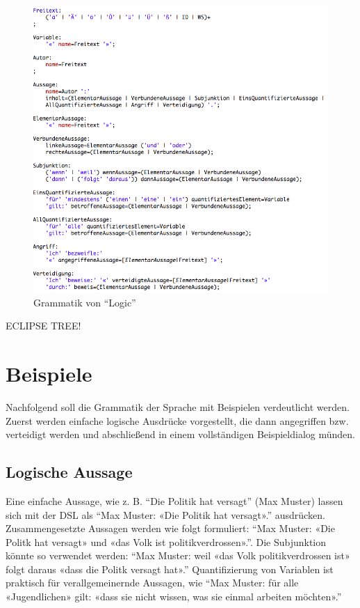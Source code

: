 \documentclass[11pt,a4paper,bibtotocnumbered]{scrreprt}
\begin{document}
\begin{figure}[htbp]
\centering
\includegraphics[width=1\textwidth]{img/grammatik.png}
\caption{Grammatik von \enquote{Logic}}
\label{grammatik}
\end{figure}


ECLIPSE TREE!

\section{Beispiele}

Nachfolgend soll die Grammatik der Sprache mit Beispielen verdeutlicht werden.
Zuerst werden einfache logische Ausdrücke vorgestellt, die dann angegriffen bzw. verteidigt werden und abschließend in einem vollständigen Beispieldialog münden.

\subsection{Logische Aussage}

Eine einfache Aussage, wie z. B. \enquote{Die Politik hat versagt} (Max Muster) lassen sich mit der DSL als \enquote{Max Muster: «Die Politik hat versagt».} ausdrücken.
Zusammengesetzte Aussagen werden wie folgt formuliert: \enquote{Max Muster: «Die Politk hat versagt» und «das Volk ist politikverdrossen».}.
Die Subjunktion könnte so verwendet werden: \enquote{Max Muster: weil «das Volk politikverdrossen ist» folgt daraus «dass die Politk versagt hat».}
Quantifizierung von Variablen ist praktisch für verallgemeinernde Aussagen, wie \enquote{Max Muster: für alle «Jugendlichen» gilt: «dass sie nicht wissen, was sie einmal arbeiten möchten».}
\end{document}
